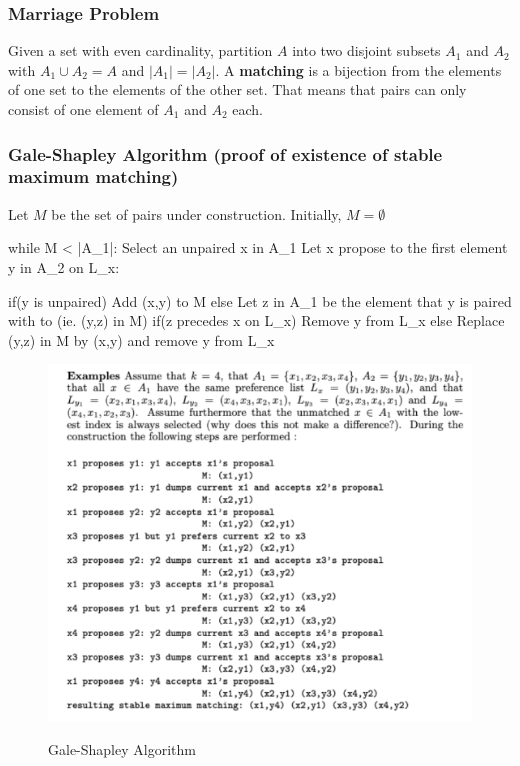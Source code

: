 \documentclass{article}
\begin{document}
\subsubsection{Marriage Problem} Given a set with even cardinality, partition $ A $ into two disjoint subsets $ A_1 $ and $ A_2 $ with $ A_1 \cup A_2 = A $ and $ |A_1| = |A_2| $. A \textbf{matching} is a bijection from the elements of one set to the elements of the other set. That means that pairs can only consist of one element of $ A_1 $ and $ A_2 $ each.

\subsubsection{Gale-Shapley Algorithm (proof of existence of stable maximum matching)} Let $ M $ be the set of pairs under construction. Initially, $ M = \emptyset $
\begin{mylisting}
	while M < |A_1|:
		Select an unpaired x in A_1
		Let x propose to the first element y in A_2 on L_x:
		
		if(y is unpaired)
			Add (x,y) to M
		else
			Let z in A_1 be the element that y is paired with to (ie. (y,z) in M)
			if(z precedes x on L_x)
				Remove y from L_x
			else
				Replace	(y,z) in M by (x,y) and remove y from L_x				
\end{mylisting}

\begin{figure}[ht]
  \includegraphics[width=\linewidth]{galeshapley.png}
  \label{fig:galeshapley}
	
\caption{Gale-Shapley Algorithm} 	
\end{figure}
\end{document}
